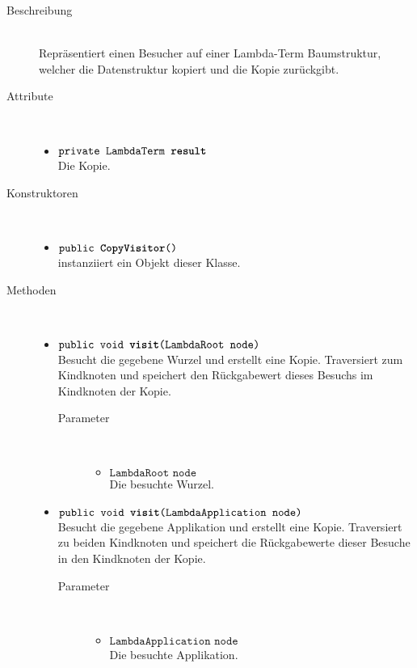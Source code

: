 \begin{description}
\item[Beschreibung] \hfill \\ Repräsentiert einen Besucher auf einer Lambda-Term Baumstruktur, welcher die Datenstruktur kopiert und die Kopie zurückgibt.

\item[Attribute] \hfill \\
	\vspace{-.8cm}
	\begin{itemize}
		\item $\texttt{private LambdaTerm \textbf{result}}$ \\ Die Kopie.
	\end{itemize}

\item[Konstruktoren] \hfill \\
	\vspace{-.8cm}
	\begin{itemize}
		\item $\texttt{public \textbf{CopyVisitor}()}$ \\ instanziiert ein Objekt dieser Klasse.
	\end{itemize}

\item[Methoden] \hfill \\
	\vspace{-.8cm}
	\begin{itemize}
		\item $\texttt{public void \textbf{visit}(LambdaRoot node)}$ \\ Besucht die gegebene Wurzel und erstellt eine Kopie. Traversiert zum Kindknoten und speichert den Rückgabewert dieses Besuchs im Kindknoten der Kopie.
		\begin{description}
			\item[Parameter] \hfill \\
			\vspace{-.8cm}
			\begin{itemize}
				\item $\texttt{LambdaRoot node}$ \\ Die besuchte Wurzel.
			\end{itemize}
		\end{description}
				
		\item $\texttt{public void \textbf{visit}(LambdaApplication node)}$ \\ Besucht die gegebene Applikation und erstellt eine Kopie. Traversiert zu beiden Kindknoten und speichert die Rückgabewerte dieser Besuche in den Kindknoten der Kopie.
		\begin{description}
			\item[Parameter] \hfill \\
			\vspace{-.8cm}
			\begin{itemize}
				\item $\texttt{LambdaApplication node}$ \\ Die besuchte Applikation.
			\end{itemize}
		\end{description}
		

\end{itemize}
\end{description}
